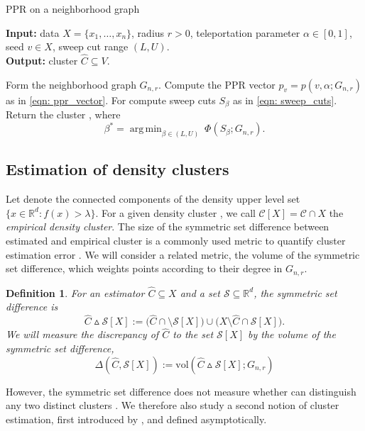 \documentclass[11pt,twoside]{article}
\newtheorem{definition}{Definition}
\newcommand{\vol}{\mathrm{vol}}
\newcommand{\Reals}{\mathbb{R}}
\newcommand{\Rd}{\Reals^d}
\newcommand{\1}{\mathbf{1}}
\newcommand{\pbf}{p}        %
\newcommand{\Xbf}{X}             %
\newcommand{\Cbb}{\mathbb{C}}
\newcommand{\Cset}{\mathcal{C}}
\newcommand{\Cest}{\widehat{C}}
\DeclareMathOperator*{\argmin}{arg\,min}
\begin{document}
\begin{algorithm}
\caption{PPR on a neighborhood graph}
\label{alg: ppr}	
{\bfseries Input:} data $\Xbf=\{x_1,\ldots,x_n\}$, radius $r > 0$, teleportation
parameter $\alpha \in [0,1]$, seed $v \in \Xbf$, sweep cut range $(L,U)$. \\     
{\bfseries Output:} cluster $\Cest \subseteq V$.
\begin{algorithmic}[1]
  \STATE Form the neighborhood graph $G_{n,r}$.
  \STATE Compute the PPR vector $\pbf_v=\pbf(v, \alpha; G_{n,r})$ as in \eqref{eqn: 
    ppr_vector}. 
  \STATE For  compute sweep cuts 
  $S_{\beta}$ as in \eqref{eqn: sweep_cuts}.
  \STATE Return the cluster \smash{$\Cest = S_{\beta^*}$}, where  
  $$
  \beta^* = \argmin_{\beta \in (L,U)}~ \Phi(S_{\beta}; G_{n,r}).
  $$
\end{algorithmic}
\end{algorithm}

\subsection{Estimation of density clusters} 
Let \smash{$\Cbb_f(\lambda)$} denote 
the connected components of the density upper level set $\{x \in \Rd: f(x) >
\lambda\}$.  For a given density cluster \smash{$\Cset \in \Cbb_f(\lambda)$}, we
call $\Cset[\Xbf] = \Cset \cap \Xbf$ the \emph{empirical density cluster}. The size of the symmetric set difference between estimated and empirical cluster is 
a commonly used metric to quantify cluster estimation error
\citep{korostelev1993,polonik1995,rigollet2009}. We will consider a related metric, the volume of the symmetric set difference, which weights points according to their degree in $G_{n,r}$. 
\begin{definition}
	\label{def:volume_symmetric_set_difference}
	For an estimator $\widehat{C} \subseteq \Xbf$ and a set $\mathcal{S} \subseteq \Rd$, the symmetric set difference is 
	\begin{equation*}
	\widehat{C} \vartriangle \mathcal{S}[\Xbf] := \bigl(\widehat{C} \cap \setminus \mathcal{S}[\Xbf]\bigr) \cup \bigl(\Xbf\setminus\widehat{C} \cap \mathcal{S}[\Xbf]\bigr).
	\end{equation*}
	We will measure the discrepancy of $\widehat{C}$ to the set $\mathcal{S}[\Xbf]$ by the volume of the symmetric set difference,
	\begin{equation*}
	\Delta(\widehat{C}, \mathcal{S}[\Xbf]) := \vol(\widehat{C} \vartriangle \mathcal{S}[\Xbf]; G_{n,r})
	\end{equation*}
\end{definition}
However, the symmetric set difference does not measure whether \smash{$\Cest$} 
can distinguish any two distinct clusters \smash{$\Cset,\Cset' \in
\Cbb_f(\lambda)$}. We therefore also study a second notion of cluster
estimation, first introduced by \citet{hartigan1981}, and defined
asymptotically. 
\end{document}
